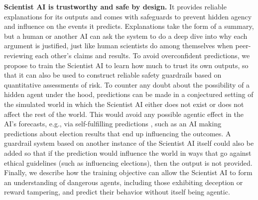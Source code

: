\textbf{Scientist AI is trustworthy and safe by design.} It provides reliable explanations for its outputs and comes with safeguards to prevent hidden agency and influence on the events it predicts. Explanations take the form of a summary, but a human or another AI \cite{arxiv.org.abs.1805.00899,arxiv.org.abs.2311.14125} can ask the system to do a deep dive into why each argument is justified, just like human scientists do among themselves when peer-reviewing each other’s claims and results. To avoid overconfident predictions, we propose to train the Scientist AI to learn how much to trust its own outputs, so that it can also be used to construct reliable safety guardrails based on quantitative assessments of risk. To counter any doubt about the possibility of a hidden agent under the hood, predictions can be made in a conjectured setting of the simulated world in which the Scientist AI either does not exist or does not affect the rest of the world. This would avoid any possible agentic effect in the AI's forecasts, e.g., via self-fulfilling predictions \cite{proceedings.mlr.press.v119.perdomo20a.html}, such as an AI making predictions about election results that end up influencing the outcomes. A guardrail system based on another instance of the Scientist AI itself could also be added so that if the prediction would influence the world in ways that go against ethical guidelines (such as influencing elections), then the output is not provided. Finally, we describe how the training objective can allow the Scientist AI to form an understanding of dangerous agents, including those exhibiting deception or reward tampering, and predict their behavior without itself being agentic.

